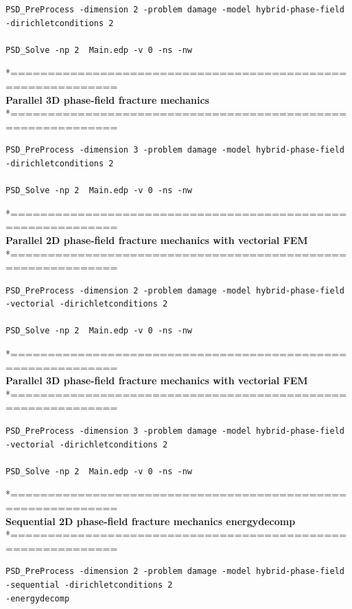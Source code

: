 {{\begin{lstlisting}[style=Linux]
PSD_PreProcess -dimension 2 -problem damage -model hybrid-phase-field -dirichletconditions 2   

PSD_Solve -np 2  Main.edp -v 0 -ns -nw   
\end{lstlisting}
*============================================================\\
\textbf{ Parallel 3D phase-field fracture mechanics} \\
*============================================================\\
\begin{lstlisting}[style=Linux]
PSD_PreProcess -dimension 3 -problem damage -model hybrid-phase-field -dirichletconditions 2   

PSD_Solve -np 2  Main.edp -v 0 -ns -nw   
\end{lstlisting}
*============================================================\\
\textbf{ Parallel 2D phase-field fracture mechanics with vectorial FEM } \\
*============================================================\\

\begin{lstlisting}[style=Linux]
PSD_PreProcess -dimension 2 -problem damage -model hybrid-phase-field -vectorial -dirichletconditions 2   

PSD_Solve -np 2  Main.edp -v 0 -ns -nw   
\end{lstlisting}
*============================================================\\
\textbf{ Parallel 3D phase-field fracture mechanics  with vectorial FEM} \\
*============================================================\\
\begin{lstlisting}[style=Linux]
PSD_PreProcess -dimension 3 -problem damage -model hybrid-phase-field -vectorial -dirichletconditions 2   

PSD_Solve -np 2  Main.edp -v 0 -ns -nw   
\end{lstlisting}
*============================================================\\
\textbf{ Sequential 2D  phase-field fracture mechanics energydecomp }\\
*============================================================\\
\begin{lstlisting}[style=Linux]
PSD_PreProcess -dimension 2 -problem damage -model hybrid-phase-field -sequential -dirichletconditions 2 
-energydecomp   


\end{lstlisting}}}
